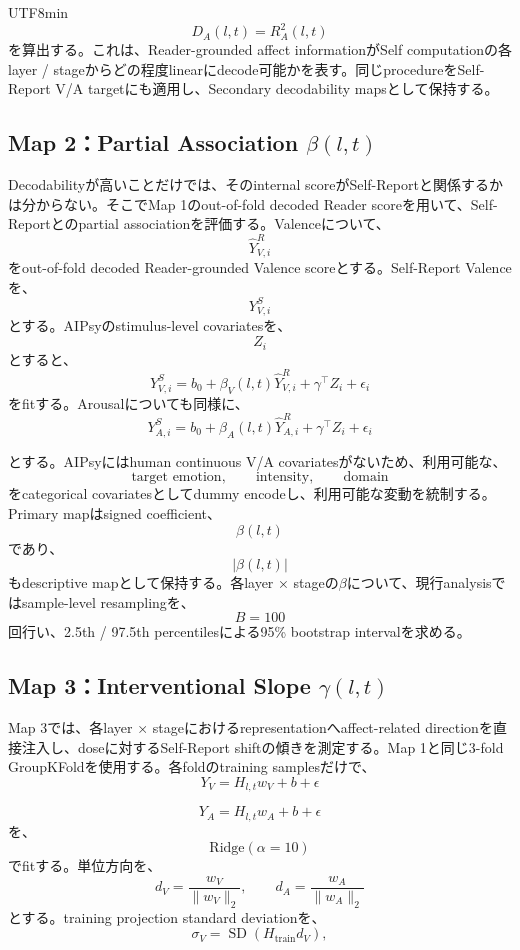 \documentclass{article} %
\begin{document}
\begin{CJK*}{UTF8}{min}
\[
D_A(l,t)
=
R_A^2(l,t)
\]
を算出する。これは、Reader-grounded affect informationがSelf computationの各layer / stageからどの程度linearにdecode可能かを表す。同じprocedureをSelf-Report V/A targetにも適用し、Secondary decodability mapsとして保持する。


\subsection{Map 2：Partial Association \(\beta(l,t)\)}

Decodabilityが高いことだけでは、そのinternal scoreがSelf-Reportと関係するかは分からない。そこでMap 1のout-of-fold decoded Reader scoreを用いて、Self-Reportとのpartial associationを評価する。Valenceについて、
\[
\hat Y_{V,i}^{R}
\]
をout-of-fold decoded Reader-grounded Valence scoreとする。Self-Report Valenceを、
\[
Y_{V,i}^{S}
\]
とする。AIPsyのstimulus-level covariatesを、
\[
Z_i
\]
とすると、
\[
Y_{V,i}^{S}
=
b_0
+
\beta_V(l,t)
\hat Y_{V,i}^{R}
+
\gamma^\top Z_i
+
\epsilon_i
\]
をfitする。Arousalについても同様に、
\[
Y_{A,i}^{S}
=
b_0
+
\beta_A(l,t)
\hat Y_{A,i}^{R}
+
\gamma^\top Z_i
+
\epsilon_i
\]

とする。AIPsyにはhuman continuous V/A covariatesがないため、利用可能な、
\[
\text{target emotion},
\qquad
\text{intensity},
\qquad
\text{domain}
\]
をcategorical covariatesとしてdummy encodeし、利用可能な変動を統制する。Primary mapはsigned coefficient、
\[
\beta(l,t)
\]
であり、
\[
|\beta(l,t)|
\]
もdescriptive mapとして保持する。各layer × stageの\(\beta\)について、現行analysisではsample-level resamplingを、
\[
B=100
\]
回行い、2.5th / 97.5th percentilesによる95\% bootstrap intervalを求める。


\subsection{Map 3：Interventional Slope \(\gamma(l,t)\)}

Map 3では、各layer × stageにおけるrepresentationへaffect-related directionを直接注入し、doseに対するSelf-Report shiftの傾きを測定する。Map 1と同じ3-fold GroupKFoldを使用する。各foldのtraining samplesだけで、
\[
Y_V
=
H_{l,t}w_V+b+\epsilon
\]

\[
Y_A
=
H_{l,t}w_A+b+\epsilon
\]
を、
\[
\text{Ridge}(\alpha=10)
\]
でfitする。単位方向を、
\[
d_V
=
\frac{w_V}{\|w_V\|_2},
\qquad
d_A
=
\frac{w_A}{\|w_A\|_2}
\]
とする。training projection standard deviationを、
\[
\sigma_V
=
\operatorname{SD}(H_{\mathrm{train}}d_V),
\]


\end{CJK*}
\end{document}
